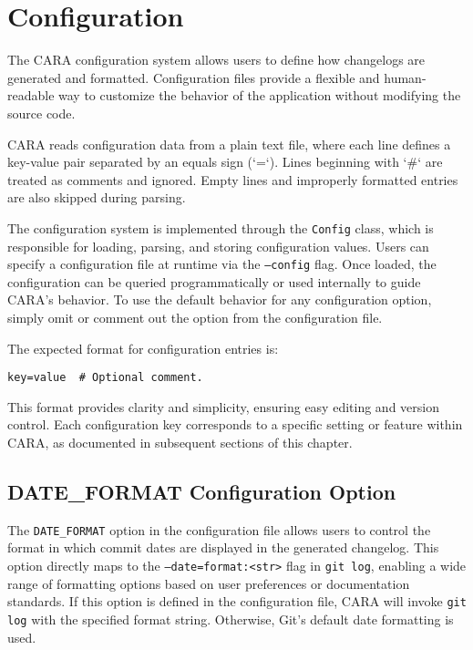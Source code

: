 \chapter{Configuration}
\label{ch:configuration}
\pagestyle{fancy}

The CARA configuration system allows users to define how changelogs are generated and formatted. Configuration files provide a flexible and human-readable way to customize the behavior of the application without modifying the source code.

CARA reads configuration data from a plain text file, where each line defines a key-value pair separated by an equals sign (`=`). Lines beginning with `\#` are treated as comments and ignored. Empty lines and improperly formatted entries are also skipped during parsing.

The configuration system is implemented through the \texttt{Config} class, which is responsible for loading, parsing, and storing configuration values. Users can specify a configuration file at runtime via the \texttt{--config} flag. Once loaded, the configuration can be queried programmatically or used internally to guide CARA’s behavior. To use the default behavior for any configuration option, simply omit or comment out the option from the configuration file.

The expected format for configuration entries is:

\begin{lstlisting}[style=cppstyle]
key=value  # Optional comment.
\end{lstlisting}

This format provides clarity and simplicity, ensuring easy editing and version control. Each configuration key corresponds to a specific setting or feature within CARA, as documented in subsequent sections of this chapter.















\section{DATE\_FORMAT Configuration Option}

The \texttt{DATE\_FORMAT} option in the configuration file allows users to control the format in which commit dates are displayed in the generated changelog. This option directly maps to the \texttt{--date=format:<str>} flag in \texttt{git log}, enabling a wide range of formatting options based on user preferences or documentation standards. If this option is defined in the configuration file, CARA will invoke \texttt{git log} with the specified format string. Otherwise, Git's default date formatting is used. 

